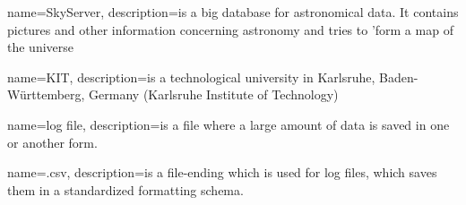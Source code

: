 
{
  name=SkyServer,
  description={is a big database for astronomical data. It contains pictures
              and other information concerning astronomy and tries to 'form a 
              map of the universe
              }
}


{
  name=KIT,
  description={is a technological university in Karlsruhe, Baden-Württemberg, Germany 
              (Karlsruhe Institute of Technology)}
}

{
  name=log file,
  description={is a file where a large amount of data is saved in one or another form.}
}

{
  name=.csv,
  description={is a file-ending which is used for log files, 
  which saves them in a standardized formatting schema.}
}
  